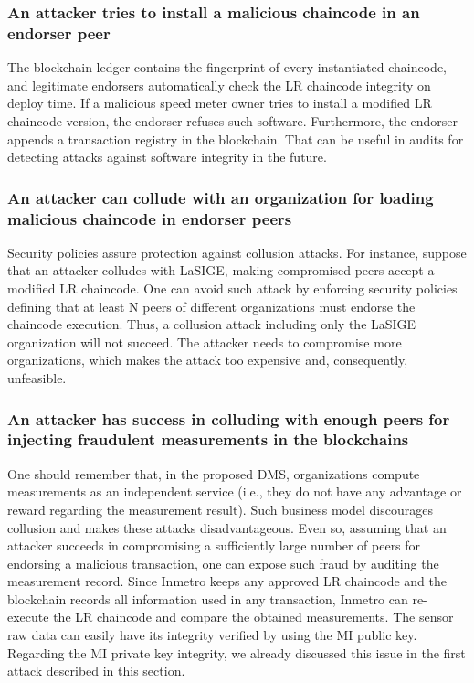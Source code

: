 \documentclass[journal]{IEEEtran}
\begin{document}
\subsubsection{An attacker tries to install a malicious chaincode in an endorser peer}
The blockchain ledger contains the fingerprint of every instantiated chaincode, and legitimate endorsers automatically check the LR chaincode integrity on deploy time.
If a malicious speed meter owner tries to install a modified LR chaincode version, the endorser refuses such software.
Furthermore, the endorser appends a transaction registry in the blockchain.
That can be useful in audits for detecting attacks against software integrity in the future.

\subsubsection{An attacker can collude with an organization for loading malicious chaincode in endorser peers}
Security policies assure protection against collusion attacks.
For instance, suppose that an attacker colludes with LaSIGE, making compromised peers accept a modified LR chaincode.
One can avoid such attack by enforcing security policies defining that at least N peers of different organizations must endorse the chaincode execution.
Thus, a collusion attack including only the LaSIGE organization will not succeed.
The attacker needs to compromise more organizations, which makes the attack too expensive and, consequently, unfeasible.

\subsubsection{An attacker has success in colluding with enough peers for injecting fraudulent measurements in the blockchains}
One should remember that, in the proposed DMS, organizations compute measurements as an independent service (i.e., they do not have any advantage or reward regarding the measurement result).
Such business model discourages collusion and makes these attacks disadvantageous.
Even so, assuming that an attacker succeeds in compromising a sufficiently large number of peers for endorsing a malicious transaction, one can expose such fraud by auditing the measurement record.
Since Inmetro keeps any approved LR chaincode and the blockchain records all information used in any transaction, Inmetro can re-execute the LR chaincode and compare the obtained measurements.
The sensor raw data can easily have its integrity verified by using the MI public key.
Regarding the MI private key integrity, we already discussed this issue in the first attack described in this section.
\end{document}
